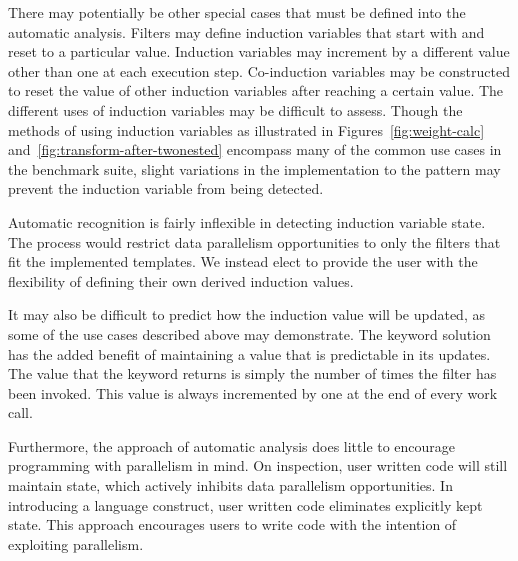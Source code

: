 There may potentially be other special cases that must be defined into the automatic analysis.  Filters may define induction variables that start with and reset to a particular value.  Induction variables may increment by a different value other than one at each execution step.  Co-induction variables may be constructed to reset the value of other induction variables after reaching a certain value.  The different uses of induction variables may be difficult to assess.  Though the methods of using induction variables as illustrated in Figures~\ref{fig:weight-calc} and~\ref{fig:transform-after-twonested} encompass many of the common use cases in the benchmark suite, slight variations in the implementation to the pattern may prevent the induction variable from being detected.

Automatic recognition is fairly inflexible in detecting induction variable state.  The process would restrict data parallelism opportunities to only the filters that fit the implemented templates.  We instead elect to provide the user with the flexibility of defining their own derived induction values.  

It may also be difficult to predict how the induction value will be updated, as some of the use cases described above may demonstrate.  The keyword solution has the added benefit of maintaining a value that is predictable in its updates.  The value that the keyword returns is simply the number of times the filter has been invoked.  This value is always incremented by one at the end of every work call.  

Furthermore, the approach of automatic analysis does little to encourage programming with parallelism in mind.  On inspection, user written code will still maintain state, which actively inhibits data parallelism opportunities.  In introducing a language construct, user written code eliminates explicitly kept state.  This approach encourages users to write code with the intention of exploiting parallelism.


